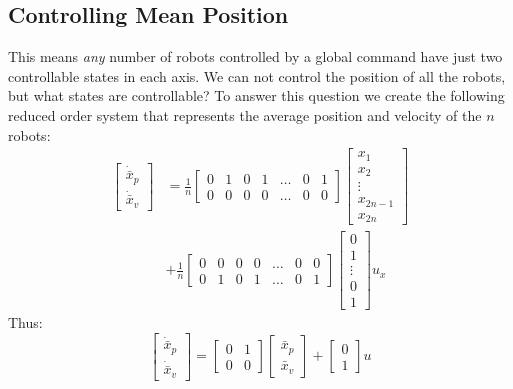 \subsection{Controlling Mean Position}\label{sec:controlMeanPosition}
This means \emph{any} number of robots controlled by a global command have just two controllable states in each axis. We can not control the position of all the robots, but what states are controllable? To answer this question we create the following reduced order system that represents the average position and velocity of the $n$ robots:
\begin{align}
\begin{bmatrix}\nonumber
\dot{\bar{x}}_p \\
\dot{\bar{x}}_v
\end{bmatrix} &= \frac{1}{n} \begin{bmatrix}
0& 1& 0& 1& \ldots &0& 1 \\
0& 0& 0& 0& \ldots &0& 0
\end{bmatrix}
\begin{bmatrix}
x_1\\
x_2\\
\vdots\\
x_{2n-1}\\
x_{2n}
\end{bmatrix} \\
&+ \frac{1}{n}\begin{bmatrix}
0& 0& 0& 0& \ldots &0& 0 \\
0& 1& 0& 1& \ldots &0& 1
\end{bmatrix}\begin{bmatrix} 
0\\
1\\
\vdots\\
0\\
1
\end{bmatrix} u_x
\end{align}
Thus:
\begin{equation}
\begin{bmatrix}
\dot{\bar{x}}_p \\
\dot{\bar{x}}_v
\end{bmatrix} = \begin{bmatrix}
0& 1 \\
0& 0
\end{bmatrix}
\begin{bmatrix}
\bar{x}_p\\
\bar{x}_v
\end{bmatrix} + \begin{bmatrix} 
0\\
1
\end{bmatrix} u
\end{equation}

